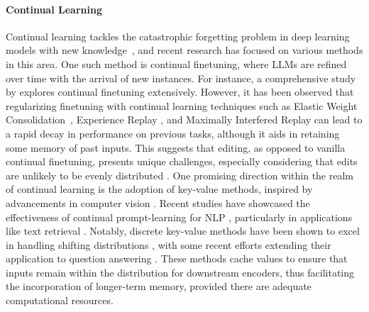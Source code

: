 \paragraph{Continual Learning}
Continual learning \cite{continual_survey1, continual_survey2} tackles the catastrophic forgetting problem in deep learning models with new knowledge~\cite{de2021continual}, and recent research has focused on various methods in this area. One such method is continual finetuning, where LLMs are refined over time with the arrival of new instances. For instance, a comprehensive study by \cite{lin2022continual} explores continual finetuning extensively. However, it has been observed that regularizing finetuning with continual learning techniques such as Elastic Weight Consolidation~\cite{ewc}, Experience Replay \cite{rolnick2019experience}, and Maximally Interfered Replay \cite{aljundi2019online} can lead to a rapid decay in performance on previous tasks, although it aids in retaining some memory of past inputs. 
This suggests that editing, as opposed to vanilla continual finetuning, presents unique challenges, especially considering that edits are unlikely to be evenly distributed \cite{henn2021principled}. 
One promising direction within the realm of continual learning is the adoption of key-value methods, inspired by advancements in computer vision \cite{liu2021post,van2017neural}. Recent studies have showcased the effectiveness of continual prompt-learning for NLP \cite{wang2022dualprompt,wang2022learning}, particularly in applications like text retrieval \cite{xiong2020approximate}. 
Notably, discrete key-value methods have been shown to excel in handling shifting distributions \cite{trauble2023discrete}, with some recent efforts extending their application to question answering \cite{dai2022lifelong}. 
These methods cache values to ensure that inputs remain within the distribution for downstream encoders, thus facilitating the incorporation of longer-term memory, provided there are adequate computational resources.